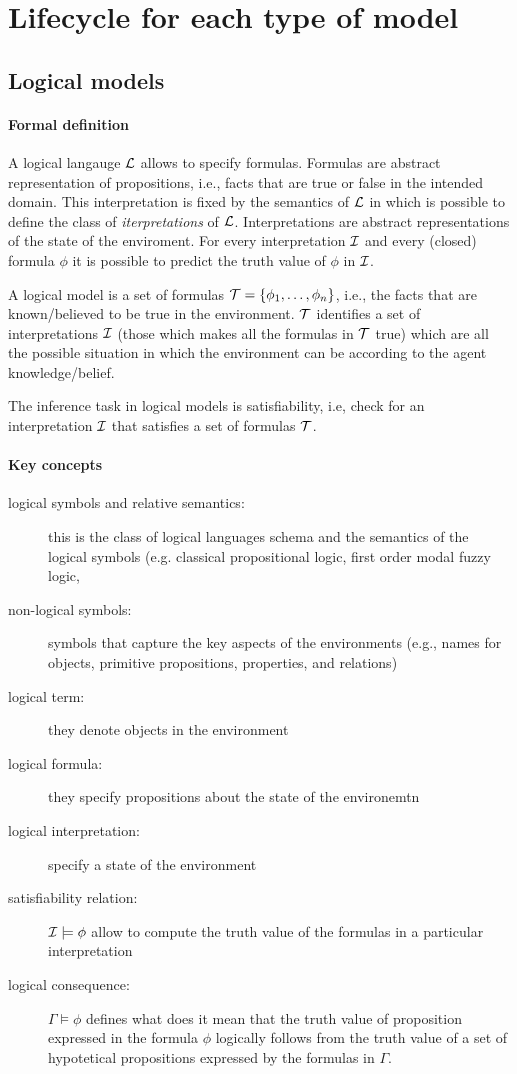 
\section{Lifecycle for each type of model}

\subsection{Logical models}
  
\paragraph{Formal definition}
A logical langauge $\mathcal{L}$ allows to specify formulas. Formulas are
abstract representation of propositions, i.e., facts that are true or
false in the intended domain. This interpretation is fixed by the
semantics of $\mathcal{L}$ in which is possible to define the class of
\emph{iterpretations} of $\mathcal{L}$. Interpretations are abstract
representations of the state of the enviroment. For every interpretation
$\mathcal{I}$ and every (closed) formula $\phi$ it is possible to predict the
truth value of $\phi$ in $\mathcal{I}$.

A logical model is a set of formulas $\mathcal{T}=\{\phi_1,\dots,\phi_n\}$,
i.e., the facts that are known/believed to be true in the
environment. $\mathcal{T}$ identifies a set of interpretations $\mathcal{I}$ (those
which makes all the formulas in $\mathcal{T}$ true) which are all the possible
situation in which the environment can be according to the agent
knowledge/belief.

The inference task in logical models is satisfiability, i.e, check for
an interpretation $\mathcal{I}$ that satisfies a set of formulas $\mathcal{T}$.

\paragraph{Key concepts}
\begin{description}
\item[logical symbols and relative semantics:] this is the class of
  logical languages schema and the semantics of the logical symbols
  (e.g. classical propositional logic, first order modal fuzzy logic, \
\item[non-logical symbols:] symbols that capture the key aspects of
  the environments (e.g., names for objects, primitive propositions,
  properties, and relations)
\item[logical term:] they denote objects in the environment 
\item[logical formula:] they specify propositions about the state of the
  environemtn
\item[logical interpretation:] specify a state of the environment
\item[satisfiability relation:] $\mathcal{I}\models\phi$ allow to compute the
  truth value of the formulas in a particular interpretation 
\item[logical consequence:] $\Gamma\models\phi$ defines what does it
  mean that the truth value of proposition expressed in the formula
  $\phi$ logically follows from the truth value of a set of
  hypotetical propositions expressed by the formulas in $\Gamma$. 
\end{description}


